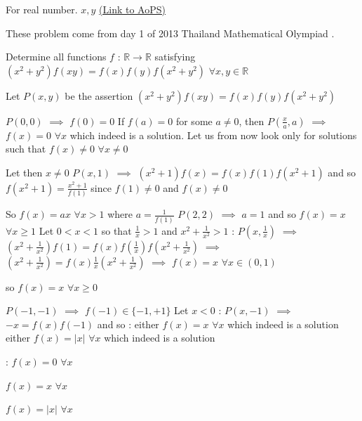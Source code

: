 \begin{problem}
	For real number. $ x,y$
	\flushright \href{https://artofproblemsolving.com/community/c6h534230}{(Link to AoPS)}
\end{problem}



\begin{solution}
	These problem come from day 1 of 2013 Thailand Mathematical Olympiad .
\end{solution}



\begin{solution}
	\begin{tcolorbox}Determine all functions $f$ : $\mathbb R\to\mathbb R$ satisfying $(x^2+y^2)f(xy)=f(x)f(y)f(x^2+y^2)$ $\forall x,y\in\mathbb R$\end{tcolorbox}
Let $P(x,y)$ be the assertion $(x^2+y^2)f(xy)=f(x)f(y)f(x^2+y^2)$

$P(0,0)$ $\implies$ $f(0)=0$
If $f(a)=0$ for some $a\ne 0$, then $P(\frac xa,a)$ $\implies$ $f(x)=0$ $\forall x$ which indeed is a solution.
Let us from now look only for solutions such that $f(x)\ne 0$ $\forall x\ne 0$

Let then $x\ne 0$ $P(x,1)$ $\implies$ $(x^2+1)f(x)=f(x)f(1)f(x^2+1)$ and so $f(x^2+1)=\frac{x^2+1}{f(1)}$ since $f(1)\ne 0$ and $f(x)\ne 0$

So $f(x)=ax$ $\forall x>1$ where $a=\frac 1{f(1)}$
$P(2,2)$ $\implies$ $a=1$ and so $f(x)=x$ $\forall x\ge 1$
Let $0<x<1$ so that $\frac 1x>1$ and $x^2+\frac 1{x^2}>1$ : $P(x,\frac 1x)$ $\implies$ $(x^2+\frac 1{x^2})f(1)=f(x)f(\frac 1x)f(x^2+\frac 1{x^2})$ $\implies$ $(x^2+\frac 1{x^2})=f(x)\frac 1x(x^2+\frac 1{x^2})$ $\implies$ $f(x)=x$ $\forall x\in(0,1)$

so $f(x)=x$ $\forall x\ge 0$

$P(-1,-1)$ $\implies$ $f(-1)\in\{-1,+1\}$
Let $x<0$ : $P(x,-1)$ $\implies$ $-x=f(x)f(-1)$ and so :
either $f(x)=x$ $\forall x$ which indeed is a solution
either $f(x)=|x|$ $\forall x$ which indeed is a solution

 :
$f(x)=0$ $\forall x$

$f(x)=x$ $\forall x$

$f(x)=|x|$ $\forall x$
\end{solution}




